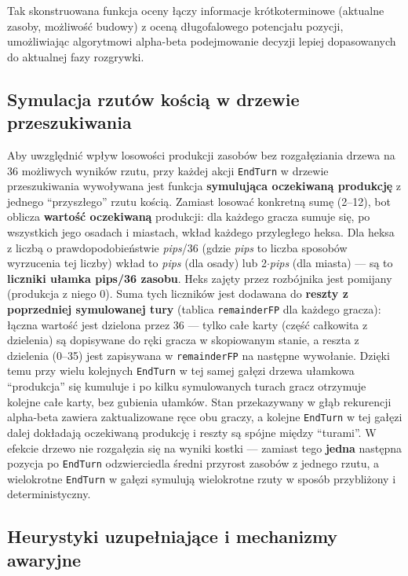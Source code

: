 \documentclass[polish,inz,longabstract]{iithesis}
\begin{document}
Tak skonstruowana funkcja oceny łączy informacje krótkoterminowe (aktualne zasoby, możliwość budowy) z oceną długofalowego potencjału pozycji, umożliwiając algorytmowi alpha-beta podejmowanie decyzji lepiej dopasowanych do aktualnej fazy rozgrywki.


\subsection{Symulacja rzutów kością w drzewie przeszukiwania}

Aby uwzględnić wpływ losowości produkcji zasobów bez rozgałęziania drzewa na 36 możliwych wyników rzutu, przy każdej akcji \texttt{EndTurn} w drzewie przeszukiwania wywoływana jest funkcja \textbf{symulująca oczekiwaną produkcję} z jednego ``przyszłego'' rzutu kością. Zamiast losować konkretną sumę (2--12), bot oblicza \textbf{wartość oczekiwaną} produkcji: dla każdego gracza sumuje się, po wszystkich jego osadach i miastach, wkład każdego przyległego heksa. Dla heksa z liczbą o prawdopodobieństwie \textit{pips}/36 (gdzie \textit{pips} to liczba sposobów wyrzucenia tej liczby) wkład to \textit{pips} (dla osady) lub 2$\cdot$\textit{pips} (dla miasta) --- są to \textbf{liczniki ułamka pips/36 zasobu}. Heks zajęty przez rozbójnika jest pomijany (produkcja z niego 0). Suma tych liczników jest dodawana do \textbf{reszty z poprzedniej symulowanej tury} (tablica \texttt{remainderFP} dla każdego gracza): łączna wartość jest dzielona przez 36 --- tylko całe karty (część całkowita z dzielenia) są dopisywane do ręki gracza w skopiowanym stanie, a reszta z dzielenia (0--35) jest zapisywana w \texttt{remainderFP} na następne wywołanie. Dzięki temu przy wielu kolejnych \texttt{EndTurn} w tej samej gałęzi drzewa ułamkowa ``produkcja'' się kumuluje i po kilku symulowanych turach gracz otrzymuje kolejne całe karty, bez gubienia ułamków. Stan przekazywany w głąb rekurencji alpha-beta zawiera zaktualizowane ręce obu graczy, a kolejne \texttt{EndTurn} w tej gałęzi dalej dokładają oczekiwaną produkcję i reszty są spójne między ``turami''. W efekcie drzewo nie rozgałęzia się na wyniki kostki --- zamiast tego \textbf{jedna} następna pozycja po \texttt{EndTurn} odzwierciedla średni przyrost zasobów z jednego rzutu, a wielokrotne \texttt{EndTurn} w gałęzi symulują wielokrotne rzuty w sposób przybliżony i deterministyczny.

\subsection{Heurystyki uzupełniające i mechanizmy awaryjne}
\end{document}
